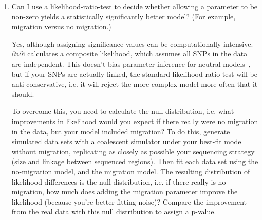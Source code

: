 \documentclass[12pt]{article}
\newcommand{\dadi}{$\partial$a$\partial$i\xspace}
\begin{document}
\begin{enumerate}
\item Can I use a likelihood-ratio-test to decide whether allowing a parameter to be non-zero yields a statistically significantly better model? (For example, migration versus no migration.)

Yes, although assigning significance values can be computationally intensive.
\dadi calculates a composite likelihood, which assumes all SNPs in the data are independent.
This doesn't bias parameter inference for neutral models~\cite{bib:Wiuf2006}, but if your SNPs are actually linked, the standard likelihood-ratio test will be anti-conservative, i.e. it will reject the more complex model more often that it should.

To overcome this, you need to calculate the null distribution, i.e. what improvements in likelihood would you expect if there really were no migration in the data, but your model included migration?
To do this, generate simulated data sets with a coalescent simulator under your best-fit model without migration, replicating as closely as possible your sequencing strategy (size and linkage between sequenced regions).
Then fit each data set using the no-migration model, and the migration model.
The resulting distribution of likelihood differences is the null distribution, i.e. if there really is no migration, how much does
adding the migration parameter improve the likelihood (because you're better fitting noise)?
Compare the improvement from the real data with this null distribution to assign a p-value.

\end{enumerate}



\end{document}
